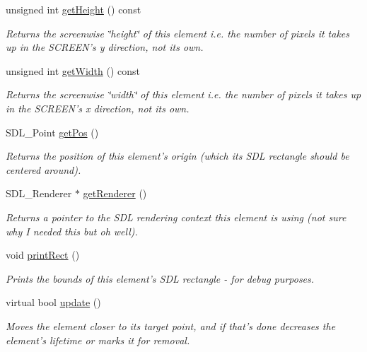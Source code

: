 \begin{DoxyCompactItemize}
unsigned int \hyperlink{classGUI_1_1Element_a736e4a8e961689ab334d8c00b58a8793}{get\-Height} () const 
\begin{DoxyCompactList}\small\item\em Returns the screenwise \char`\"{}height\char`\"{} of this element i.\-e. the number of pixels it takes up in the S\-C\-R\-E\-E\-N's y direction, not its own. \end{DoxyCompactList}\item 
unsigned int \hyperlink{classGUI_1_1Element_a0b2100060dab00523e363f0923b4fdcf}{get\-Width} () const 
\begin{DoxyCompactList}\small\item\em Returns the screenwise \char`\"{}width\char`\"{} of this element i.\-e. the number of pixels it takes up in the S\-C\-R\-E\-E\-N's x direction, not its own. \end{DoxyCompactList}\item 
S\-D\-L\-\_\-\-Point \hyperlink{classGUI_1_1Element_a5a4bc2bd60b123dd57c8ab5c401dedfe}{get\-Pos} ()
\begin{DoxyCompactList}\small\item\em Returns the position of this element's origin (which its S\-D\-L rectangle should be centered around). \end{DoxyCompactList}\item 
S\-D\-L\-\_\-\-Renderer $\ast$ \hyperlink{classGUI_1_1Element_a516b53954c5ba16bac5b9b9ddeaa6eb3}{get\-Renderer} ()
\begin{DoxyCompactList}\small\item\em Returns a pointer to the S\-D\-L rendering context this element is using (not sure why I needed this but oh well). \end{DoxyCompactList}\item 
void \hyperlink{classGUI_1_1Element_aabff5bfcbb607c58600b056b2200c047}{print\-Rect} ()
\begin{DoxyCompactList}\small\item\em Prints the bounds of this element's S\-D\-L rectangle -\/ for debug purposes. \end{DoxyCompactList}\item 
virtual bool \hyperlink{classGUI_1_1Element_ac33ecb92a9f9cb810bea83f31e4c14c9}{update} ()
\begin{DoxyCompactList}\small\item\em Moves the element closer to its target point, and if that's done decreases the element's lifetime or marks it for removal. \end{DoxyCompactList}\item 

\end{DoxyCompactItemize}
